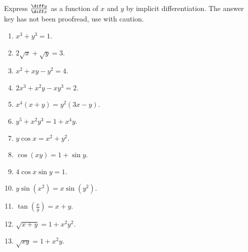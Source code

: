 Express $\frac{\diff y}{\diff x}$ as a function of $x$ and $y$ by implicit differentiation. The answer key has not been proofread, use with caution.
\begin{multicols}{2}
\begin{enumerate}[ref={\fcProblemRef}]
\item $x^3+y^3=1$.

\item $ 2\sqrt x+\sqrt y=3$.

\item $ x^2+x y-y^2=4$.

\item $ 2x^3+x^2y-x y^3=2$.

\item $ x^4(x+y)=y^2(3x-y)$.

\item $ y^5+x^2y^3=1+x^4y $.

\item $ y\cos x=x^2+y^2 $.

\item $ \cos (x y)=1+\sin y$.

\item $ 4\cos x\sin y=1$.

\item $ y\sin \left(x^2\right)=x\sin \left(y^2\right)$.

\item $ \tan \left(\frac{x}{y}\right)=x+y$.

\item $ \sqrt{x+y}=1+x^2y^2$.

\item $ \sqrt{xy}=1+x^2 y$.


\end{enumerate}
\end{multicols}
